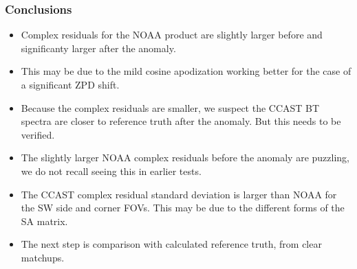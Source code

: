 \documentclass[10pt]{beamer}
\begin{document}
\begin{frame}
\frametitle{Conclusions}
\begin{itemize}

  \item Complex residuals for the NOAA product are slightly larger
    before and significanty larger after the anomaly.

  \item This may be due to the mild cosine apodization working
    better for the case of a significant ZPD shift.

  \item Because the complex residuals are smaller, we suspect
    the CCAST BT spectra are closer to reference truth after the
    anomaly.  But this needs to be verified.

  \item The slightly larger NOAA complex residuals before the
    anomaly are puzzling, we do not recall seeing this in earlier
    tests.

  \item The CCAST complex residual standard deviation is larger
    than NOAA for the SW side and corner FOVs.  This may be due to
    the different forms of the SA matrix.

  \item The next step is comparison with calculated reference truth,
    from clear matchups.

\end{itemize}
\end{frame}
\end{document}
